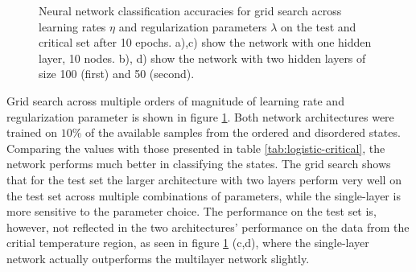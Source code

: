 \begin{figure}[h]
{	}
    \caption{
	Neural network classification accuracies for grid search across 
	learning rates $\eta$ and regularization parameters $\lambda$ on 
	the test and critical set after 10 epochs.
	a),c) show the network with one hidden layer, 10 nodes. 
	b), d) show the network with two hidden layers of size 100 (first) and 50
	(second). 
	}
    \label{fig:nn-grids}
\end{figure}
Grid search across multiple orders of magnitude of learning rate and
regularization parameter is shown in figure \ref{fig:nn-grids}. 
Both network architectures were trained on 
$10\%$ of the available samples from the ordered and disordered states.
Comparing the values with those presented in table \ref{tab:logistic-critical},
the network performs much better in classifying the states.
The grid search shows that for the test set the larger architecture with two layers
perform very well on the test set across multiple combinations of parameters,
while the single-layer is more sensitive to the parameter choice.
The performance on the test set is, however, not reflected in the two architectures'
performance on the data from the critial temperature region, as seen in figure 
\ref{fig:nn-grids} (c,d), where the single-layer network actually outperforms the
multilayer network slightly.
